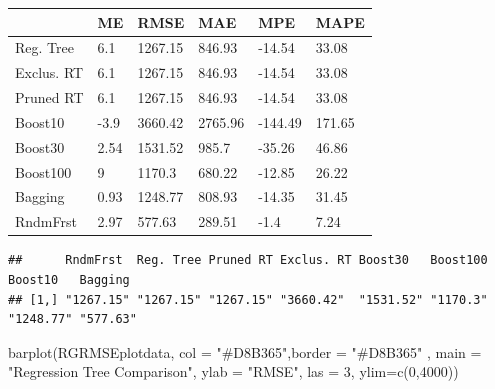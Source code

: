 \documentclass[
]{article}
\newenvironment{Shaded}{\begin{snugshade}}{\end{snugshade}}
\newcommand{\AttributeTok}[1]{\textcolor[rgb]{0.77,0.63,0.00}{#1}}
\newcommand{\ConstantTok}[1]{\textcolor[rgb]{0.00,0.00,0.00}{#1}}
\newcommand{\DecValTok}[1]{\textcolor[rgb]{0.00,0.00,0.81}{#1}}
\newcommand{\FunctionTok}[1]{\textcolor[rgb]{0.00,0.00,0.00}{#1}}
\newcommand{\NormalTok}[1]{#1}
\newcommand{\OtherTok}[1]{\textcolor[rgb]{0.56,0.35,0.01}{#1}}
\newcommand{\SpecialCharTok}[1]{\textcolor[rgb]{0.00,0.00,0.00}{#1}}
\newcommand{\StringTok}[1]{\textcolor[rgb]{0.31,0.60,0.02}{#1}}
\begin{document}
\begin{table}
\centering
\begin{tabu} to 
\hline
  & ME & RMSE & MAE & MPE & MAPE\\
\hline
Reg. Tree & 6.1 & 1267.15 & 846.93 & -14.54 & 33.08\\
\hline
Exclus. RT & 6.1 & 1267.15 & 846.93 & -14.54 & 33.08\\
\hline
Pruned RT & 6.1 & 1267.15 & 846.93 & -14.54 & 33.08\\
\hline
Boost10 & -3.9 & 3660.42 & 2765.96 & -144.49 & 171.65\\
\hline
Boost30 & 2.54 & 1531.52 & 985.7 & -35.26 & 46.86\\
\hline
Boost100 & 9 & 1170.3 & 680.22 & -12.85 & 26.22\\
\hline
Bagging & 0.93 & 1248.77 & 808.93 & -14.35 & 31.45\\
\hline
RndmFrst & 2.97 & 577.63 & 289.51 & -1.4 & 7.24\\
\hline
\end{tabu}
\end{table}

\begin{Shaded}
\end{Shaded}

\begin{verbatim}
##      RndmFrst  Reg. Tree Pruned RT Exclus. RT Boost30   Boost100 Boost10   Bagging 
## [1,] "1267.15" "1267.15" "1267.15" "3660.42"  "1531.52" "1170.3" "1248.77" "577.63"
\end{verbatim}

\begin{Shaded}
\begin{Highlighting}[]
\FunctionTok{barplot}\NormalTok{(RGRMSEplotdata, }\AttributeTok{col =} \StringTok{"\#D8B365"}\NormalTok{,}\AttributeTok{border =} \StringTok{"\#D8B365"}\NormalTok{ ,}
         \AttributeTok{main =} \StringTok{"Regression Tree Comparison"}\NormalTok{, }\AttributeTok{ylab =} \StringTok{"RMSE"}\NormalTok{, }\AttributeTok{las =} \DecValTok{3}\NormalTok{, }\AttributeTok{ylim=}\FunctionTok{c}\NormalTok{(}\DecValTok{0}\NormalTok{,}\DecValTok{4000}\NormalTok{))}
\end{Highlighting}
\end{Shaded}
\end{document}
